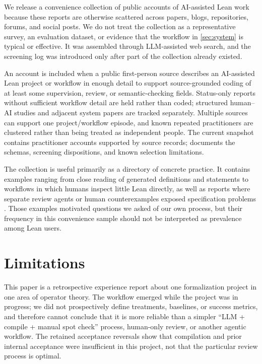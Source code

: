 \documentclass{article}
\begin{document}
We release a convenience collection of public accounts of AI-assisted Lean
work because these reports are otherwise scattered across papers, blogs,
repositories, forums, and social posts.  We do not treat the collection as a
representative survey, an evaluation dataset, or evidence that the workflow in
\cref{sec:system} is typical or effective.  It was assembled through
LLM-assisted web search, and the screening log was introduced only after part
of the collection already existed.

An account is included when a public first-person source describes an
AI-assisted Lean project or workflow in enough detail to support source-grounded
coding of at least some supervision, review, or semantic-checking fields.
Status-only reports without sufficient workflow detail are held rather than
coded; structured human--AI studies and adjacent system papers are tracked
separately.  Multiple sources can support one project/workflow episode, and
known repeated practitioners are clustered rather than being treated as
independent people.  The current snapshot contains \PractitionerAccountCount{}
practitioner accounts supported by \PractitionerSourceCount{} source records;
 documents the schemas, screening dispositions, and known
selection limitations.

The collection is useful primarily as a directory of concrete practice.  It
contains examples ranging from close reading of generated definitions and
statements to workflows in which humans inspect little Lean directly, as well
as reports where separate review agents or human counterexamples exposed
specification problems
\citep{kahle2026keeptrying,yadav2026verification,gowers2026leiden,zhang2026slt,zaliva2026semantics}.
Those examples motivated questions we asked of our own process, but their
frequency in this convenience sample should not be interpreted as prevalence
among Lean users.

\section{Limitations}
\label{sec:limitations}

This paper is a retrospective experience report about one formalization project
in one area of operator theory.  The workflow emerged while the project was in
progress; we did not prospectively define treatments, baselines, or success
metrics, and therefore cannot conclude that it is more reliable than a simpler
``LLM + compile + manual spot check'' process, human-only review, or another
agentic workflow.  The retained acceptance reversals show that compilation and
prior internal acceptance were insufficient in this project, not that the
particular review process is optimal.
\end{document}
